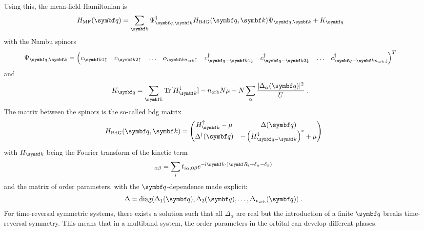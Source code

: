 \documentclass[../main.tex]{subfiles}
\begin{document}
Using this, the mean-field Hamiltonian is
\begin{align}
	H_{\mathrm{MF}} (\vb{q}) &= \sum_{\vb{k}} \Psi_{\vb{q}, \vb{k}}^{\dagger} H_{\mathrm{BdG}} (\vb{q}, \vb{k}) \Psi_{\vb{q}, \vb{k}} + K_{\vb{q}}
\end{align}
with the Nambu spinors
\begin{align}
	\Psi_{\vb{q}, \vb{k}} &= 
	\begin{pmatrix}
		c_{\vb{k} 1 \uparrow} & 
		c_{\vb{k} 2 \uparrow} &
		\ldots &
		c_{\vb{k} n_{\mathrm{orb}} \uparrow} &
		c_{\vb{q} -\vb{k} 1 \downarrow}^{\dagger} &
		c_{\vb{q} -\vb{k} 2 \downarrow}^{\dagger} &
		\ldots &
		c_{\vb{q} -\vb{k} n_{\mathrm{orb}} \downarrow}^{\dagger}
	\end{pmatrix}^{T} \label{eq:Nambu spinor BCS theory}
\end{align}
and
\begin{align}
	K_{\vb{q}} &= \sum_{\vb{k}} \Tr [H_{\vb{k}}^{\downarrow}] - n_{\mathrm{orb}} N \mu - N \sum_{\alpha} \frac{\vert \Delta_{\alpha} (\vb{q}) \vert^2}{U} \;.
\end{align}
The matrix between the spinors is the so-called \gls{bdg} matrix
\begin{equation}
	H_{\mathrm{BdG}} (\vb{q}, \vb{k}) =
	\begin{pmatrix}
		H^{\uparrow}_{\vb{k}} - \mu & \Delta (\vb{q}) \\
		\Delta^{\dagger} (\vb{q}) & - \left(H^{\downarrow}_{\vb{q} - \vb{k}}\right)^* + \mu
	\end{pmatrix}
	\label{eq:BdG matrix}
\end{equation}
with \(H_{\vb{k}}\) being the Fourier transform of the kinetic term
\begin{equation}
	[H_{\vb{k}}]_{\alpha \beta} = \sum_i t_{i \alpha, 0 \beta} e^{-\iu \vb{k} \cdot (\vb{R}_i + \delta_{\alpha} - \delta_{\beta})}
\end{equation}
and the matrix of order parameters, with the \(\vb{q}\)-dependence made explicit:
\begin{equation}
	\Delta = \diag(\Delta_1 (\vb{q}), \Delta_2 (\vb{q}), \ldots, \Delta_{n_{\mathrm{orb}}} (\vb{q}))\;.
\end{equation}
For time-reversal symmetric systems, there exists a solution such that all \(\Delta_{\alpha}\) are real \cite{peottaSuperfluidityTopologicallyNontrivial2015} but the introduction of a finite \(\vb{q}\) breaks time-reversal symmetry.
This means that in a multiband system, the order parameters in the orbital can develop different phases.
\end{document}
